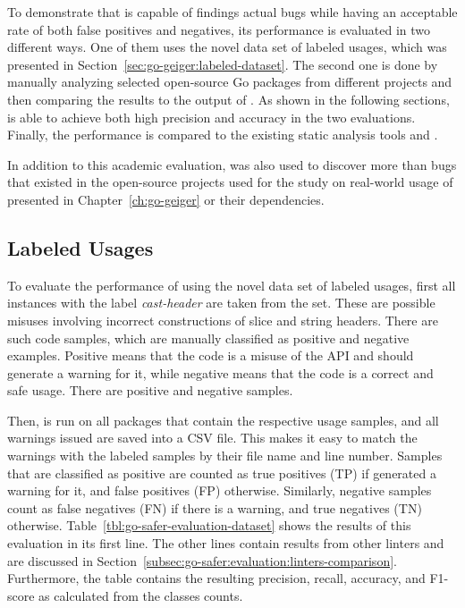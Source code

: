 To demonstrate that \toolSafer{} is capable of findings actual bugs while having an acceptable rate of both false
positives and negatives, its performance is evaluated in two different ways.
One of them uses the novel data set of labeled \unsafe{} usages, which was presented in
Section~\ref{sec:go-geiger:labeled-dataset}.
The second one is done by manually analyzing  selected open-source Go packages from different projects and
then comparing the results to the output of \toolSafer{}.
As shown in the following sections, \toolSafer{} is able to achieve both high precision and accuracy in the two
evaluations.
Finally, the performance is compared to the existing static analysis tools \toolVet{} and \toolGosec{}.

In addition to this academic evaluation, \toolSafer{} was also used to discover more than \numberBugsFixedRounded{} bugs
that existed in the open-source projects used for the study on real-world usage of \unsafe{} presented in
Chapter~\ref{ch:go-geiger} or their dependencies.



\subsection{Labeled Usages}\label{subsec:go-safer:evaluation:labeled-usages}

To evaluate the performance of \toolSafer{} using the novel data set of labeled \unsafe{} usages, first all instances
with the label \textit{cast-header} are taken from the set.
These are possible misuses involving incorrect constructions of slice and string headers.
There are  such code samples, which are manually classified as positive and negative examples.
Positive means that the code is a misuse of the \unsafe{} \acrshort{API} and \toolSafer{} should generate a warning for
it, while negative means that the code is a correct and safe usage.
There are  positive and  negative samples.

Then, \toolSafer{} is run on all packages that contain the respective  \unsafe{} usage samples, and all
warnings issued are saved into a \acrshort{CSV} file.
This makes it easy to match the warnings with the labeled samples by their file name and line number.
Samples that are classified as positive are counted as true positives (TP) if \toolSafer{} generated a warning for it,
and false positives (FP) otherwise.
Similarly, negative samples count as false negatives (FN) if there is a warning, and true negatives (TN) otherwise.
Table~\ref{tbl:go-safer-evaluation-dataset} shows the results of this evaluation in its first line.
The other lines contain results from other linters and are discussed in
Section~\ref{subsec:go-safer:evaluation:linters-comparison}.
Furthermore, the table contains the resulting precision, recall, accuracy, and F1-score as calculated from the classes
counts.

